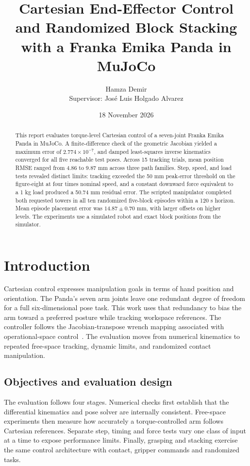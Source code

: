\documentclass[12pt,a4paper]{article}
\title{Cartesian End-Effector Control and Randomized Block Stacking\\with a Franka Emika Panda in MuJoCo}
\author{Hamza Demir\\\small Supervisor: Jos\'e Luis Holgado Alvarez}
\date{18 November 2026}
\begin{document}
\maketitle
\begin{abstract}
This report evaluates torque-level Cartesian control of a seven-joint Franka Emika Panda in MuJoCo. A finite-difference check of the geometric Jacobian yielded a maximum error of $2.774\times10^{-7}$, and damped least-squares inverse kinematics converged for all five reachable test poses. Across 15 tracking trials, mean position RMSE ranged from 4.86 to 9.87 mm across three path families. Step, speed, and load tests revealed distinct limits: tracking exceeded the 50 mm peak-error threshold on the figure-eight at four times nominal speed, and a constant downward force equivalent to a 1 kg load produced a 50.74 mm residual error. The scripted manipulator completed both requested towers in all ten randomized five-block episodes within a 120 s horizon. Mean episode placement error was $14.87\pm0.70$ mm, with larger offsets on higher levels. The experiments use a simulated robot and exact block positions from the simulator.
\end{abstract}
\clearpage
\setcounter{tocdepth}{2}
\begingroup
\singlespacing
\setlength{\parskip}{0pt}
\tableofcontents
\endgroup

\clearpage
\section{Introduction}
Cartesian control expresses manipulation goals in terms of hand position and orientation. The Panda's seven arm joints leave one redundant degree of freedom for a full six-dimensional pose task. This work uses that redundancy to bias the arm toward a preferred posture while tracking workspace references. The controller follows the Jacobian-transpose wrench mapping associated with operational-space control~\cite{khatib1987}. The evaluation moves from numerical kinematics to repeated free-space tracking, dynamic limits, and randomized contact manipulation.

\subsection{Objectives and evaluation design}
The evaluation follows four stages. Numerical checks first establish that the differential kinematics and pose solver are internally consistent. Free-space experiments then measure how accurately a torque-controlled arm follows Cartesian references. Separate step, timing and force tests vary one class of input at a time to expose performance limits. Finally, grasping and stacking exercise the same control architecture with contact, gripper commands and randomized tasks.
\end{document}

